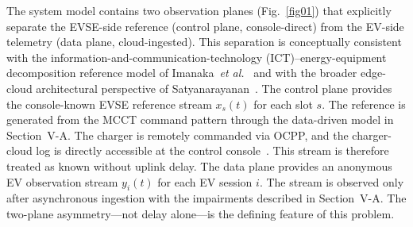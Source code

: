 \documentclass{ieeeaccess}
\begin{document}
    The system model contains two observation planes (Fig.~\ref{fig01}) that explicitly separate the EVSE-side reference (control plane, console-direct) from the EV-side telemetry (data plane, cloud-ingested).
    This separation is conceptually consistent with the information-and-communication-technology (ICT)--energy-equipment decomposition reference model of Imanaka~\textit{et al.}~\cite{bimanaka23} and with the broader edge-cloud architectural perspective of Satyanarayanan~\cite{bsatya}.
    The control plane provides the console-known EVSE reference stream $x_s(t)$ for each slot $s$.
    The reference is generated from the MCCT command pattern through the data-driven model in Section~V-A.
    The charger is remotely commanded via OCPP, and the charger-cloud log is directly accessible at the control console~\cite{b14}.
    This stream is therefore treated as known without uplink delay.
    The data plane provides an anonymous EV observation stream $y_i(t)$ for each EV session $i$.
    The stream is observed only after asynchronous ingestion with the impairments described in Section~V-A.
    The two-plane asymmetry---not delay alone---is the defining feature of this problem.
\end{document}
